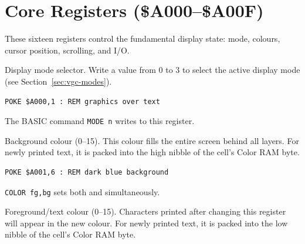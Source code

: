 \section{Core Registers (\$A000--\$A00F)}
\label{sec:vgc-core}

These sixteen registers control the fundamental display state: mode, colours,
cursor position, scrolling, and I/O.



Display mode selector.  Write a value from 0 to 3 to select the active display
mode (see Section~\ref{sec:vgc-modes}).

\begin{lstlisting}
POKE $A000,1 : REM graphics over text
\end{lstlisting}

\begin{notebox}
The BASIC command \texttt{MODE n} writes to this register.
\end{notebox}



Background colour (0--15).  This colour fills the entire screen behind all
layers.  For newly printed text, it is packed into the high nibble of the
cell's Color RAM byte.

\begin{lstlisting}
POKE $A001,6 : REM dark blue background
\end{lstlisting}

\begin{notebox}
\texttt{COLOR fg,bg} sets both  and  simultaneously.
\end{notebox}



Foreground/text colour (0--15).  Characters printed after changing this
register will appear in the new colour.  For newly printed text, it is packed
into the low nibble of the cell's Color RAM byte.

